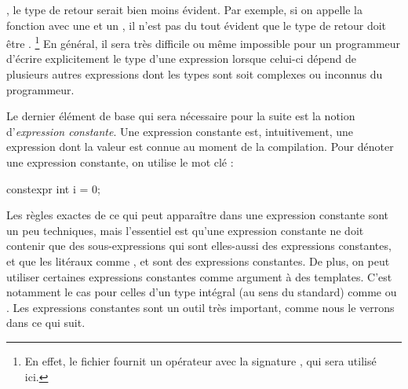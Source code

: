 , le type de retour serait bien moins évident. Par exemple, si on appelle la
fonction  avec une  et un , il
n'est pas du tout évident que le type de retour doit être .
\footnote{
    En effet, le fichier  fournit un opérateur avec la signature
    , qui sera utilisé ici.
}
En général, il sera très difficile ou même impossible pour un programmeur
d'écrire explicitement le type d'une expression lorsque celui-ci dépend de
plusieurs autres expressions dont les types sont soit complexes ou inconnus
du programmeur.

Le dernier élément de base qui sera nécessaire pour la suite est la notion
d'\textit{expression constante}. Une expression constante est, intuitivement,
une expression dont la valeur est connue au moment de la compilation. Pour
dénoter une expression constante, on utilise le mot clé :
\begin{cpp}
    constexpr int i = 0;
\end{cpp}

Les règles exactes de ce qui peut apparaître dans une expression constante
sont un peu techniques, mais l'essentiel est qu'une expression constante ne
doit contenir que des sous-expressions qui sont elles-aussi des expressions
constantes, et que les litéraux comme ,  et 
sont des expressions constantes. De plus, on peut utiliser certaines
expressions constantes comme argument à des templates. C'est notamment le
cas pour celles d'un type intégral (au sens du standard) comme 
ou . Les expressions constantes sont un outil très important,
comme nous le verrons dans ce qui suit.



